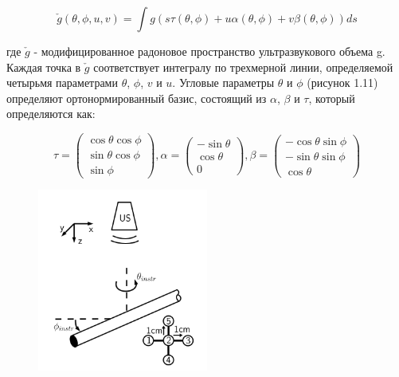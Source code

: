 \begin{equation}
\check{g}(\theta, \phi, u, v)=\int g(s \tau(\theta, \phi)+u \alpha(\theta, \phi)+v \beta(\theta, \phi)) d s
\end{equation}

где $\check{g}$ - модифицированное радоновое пространство ультразвукового объема g. Каждая точка в $\check{g}$ соответствует интегралу по трехмерной линии, определяемой четырьмя параметрами $\theta$, $\phi$, $v$ и $u$. Угловые параметры $\theta$ и $\phi$ (рисунок 1.11) \cite{litlink38} определяют ортонормированный базис, состоящий из $\alpha$, $\beta$ и $\tau$, который определяются как:

\begin{equation}
\tau=\left(\begin{array}{c}
\cos \theta \cos \phi \\
\sin \theta \cos \phi \\
\sin \phi
\end{array}\right), \alpha=\left(\begin{array}{c}
-\sin \theta \\
\cos \theta \\
0
\end{array}\right), \beta=\left(\begin{array}{c}
-\cos \theta \sin \phi \\
-\sin \theta \sin \phi \\
\cos \theta
\end{array}\right)
\end{equation}

\begin{figure}[!h]
\begin{center}
\includegraphics[width=0.5\textwidth]{Рисунки/угловые.png}
\caption{\centering {}}
\label{част}
\end{center}
\end{figure}

